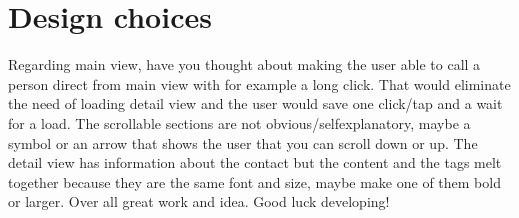 \documentclass[11pt,twoside,a4paper]{report}
\begin{document}
\section{Design choices}
Regarding main view, have you thought about making the user able to call a person direct from main view with for example a long click.
That would eliminate the need of loading detail view and the user would save one click/tap and a wait for a load. The scrollable sections
are not obvious/selfexplanatory, maybe a symbol or an arrow that shows the user that you can scroll down or up.
The detail view has information about the contact but the content and the tags melt together because they are the same font and size, 
maybe make one of them bold or larger.
Over all great work and idea. Good luck developing!
\end{document}

